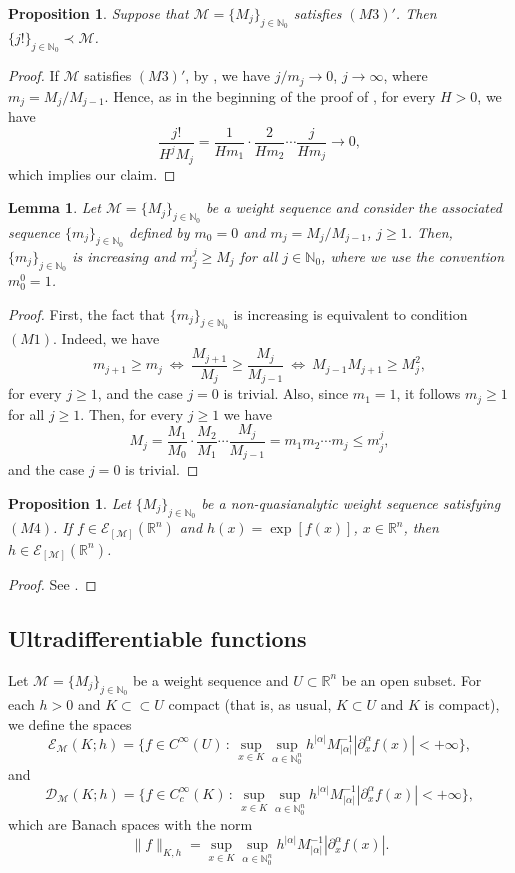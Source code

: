 \documentclass[11pt,reqno]{amsart}
\numberwithin{equation}{section}
\newtheorem{lemma}[theorem]{Lemma}
\newtheorem{proposition}[theorem]{Proposition}
\newcommand{\R}{{\mathbb{R}}} %
\newcommand{\N}{{\mathbb{N}}} %
\newcommand{\E}{{\mathcal{E}}}
\newcommand{\D}{{\mathcal{D}}}
\newcommand{\Mj}{{\{M_j\}_{j\in\mathbb{N}_0}}} %
\newcommand{\M}{{\mathcal{M}}} %
\newcommand{\mj}{{\{m_j\}_{j\in\mathbb{N}_0}}}
\begin{document}
%
\begin{proposition}\label{incl_quasi_factorial}
	Suppose that $\M=\Mj$ satisfies $(M3)'$. Then $\{j!\}_{j\in\N_0}\prec \M$.
\end{proposition}
%
\begin{proof}
	If $\M$ satisfies $(M3)'$, by \cite[Lemma 4.1]{Komatsu_ultra_1}, we have $j/m_j\to 0$, $j\to\infty$, where $m_j = M_j/M_{j-1}$. Hence, as in the beginning of the proof of \cite[Theorem 7.2]{Komatsu_ultra_1}, for every $H>0$, we have
	\[\frac{j!}{H^j M_j} = \frac{1}{Hm_1} \cdot \frac{2}{Hm_2}\cdots \frac{j}{Hm_j} \to 0,\]
	which implies our claim.
\end{proof}



\begin{lemma}\label{lemma_mjj_Mj}
	Let $\M=\Mj$ be a weight sequence and consider the associated sequence $\mj$ defined by $m_0=0$ and $m_j=M_j/M_{j-1}$, $j\geq 1$. Then, $\mj$ is increasing and $m_j^j\geq M_j$ for all $j\in\N_0$, where we use the convention $m_0^0=1$.
\end{lemma}
%
\begin{proof}
	First, the fact that $\mj$ is increasing is equivalent to condition $(M1)$. Indeed, we have
	\[m_{j+1}\geq m_j\ \Leftrightarrow\ \frac{M_{j+1}}{M_j}\geq \frac{M_j}{M_{j-1}}\ \Leftrightarrow\ M_{j-1}M_{j+1}\geq M_j^2,\]
	for every $j\geq 1$, and the case $j=0$ is trivial. Also, since $m_1=1$, it follows $m_j\geq 1$ for all $j\geq 1$. Then, for every $j\geq 1$ we have
	\[M_j = \frac{M_1}{M_0}\cdot\frac{M_2}{M_1}\cdots\frac{M_j}{M_{j-1}} = m_1m_2\cdots m_j \leq m_j^j,\]
	and the case $j=0$ is trivial.
\end{proof} 

\begin{proposition}\label{exp_EM}
	Let $\Mj$ be a non-quasianalytic weight sequence satisfying $(M4)$. If $f\in\E_{[\M]}(\R^n)$ and $h(x)=\exp[f(x)]$, $x\in\R^n$, then $h\in \E_{[\M]}(\R^n)$.
\end{proposition}
%
\begin{proof}
	See \cite[Lemma 6.9]{wagner_thesis}.
\end{proof}


\subsection{Ultradifferentiable functions}

Let $\M=\Mj$ be a weight sequence and $U\subset\R^n$ be an open subset. For each $h>0$ and $K\subset\subset U$ compact (that is, as usual, $K\subset U$ and $K$ is compact), we define the spaces
%
\[\E_{\M}(K;h) = \{f\in C^\infty(U)\,:\, \sup_{x\in K} \sup_{\alpha\in\N_0^n} h^{|\alpha|} M_{|\alpha|}^{-1} |\partial_x^\alpha f(x)| < +\infty\},\]
%
and
%
\[\D_{\M}(K;h) = \{f\in C_c^\infty(K)\,:\, \sup_{x\in K} \sup_{\alpha\in\N_0^n} h^{|\alpha|} M_{|\alpha|}^{-1} |\partial_x^\alpha f(x)| < +\infty\},\]
%
which are Banach spaces with the norm
%
\[\|f\|_{K,h} = \sup_{x\in K} \sup_{\alpha\in\N_0^n} h^{|\alpha|} M_{|\alpha|}^{-1} |\partial_x^\alpha f(x)|.\]
\end{document}

